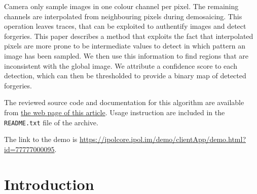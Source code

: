 \documentclass{ipol}
\begin{document}
\begin{ipolAbstract}
        Camera only sample images in one colour channel per pixel. The remaining channels are interpolated from neighbouring pixels during demosaicing. This operation leaves traces, that can be exploited to authentify images and detect forgeries. This paper describes a method that exploits the fact that interpolated pixels are more prone to be intermediate values to detect in which pattern an image has been sampled. We then use this information to find regions that are inconsistent with the global image. We attribute a confidence score to each detection, which can then be thresholded to provide a binary map of detected forgeries.
\end{ipolAbstract}

\begin{ipolCode}
The reviewed source code and documentation for this algorithm are
available from \href{\ipolLink}{the web page of this
article}. Usage instruction are included in the
\verb|README.txt| file of the archive.
\end{ipolCode}

\begin{ipolSupp}
The link to the demo is \href{https://ipolcore.ipol.im/demo/clientApp/demo.html?id=77777000095}{https://ipolcore.ipol.im/demo/clientApp/demo.html?id=77777000095}.
\end{ipolSupp}

\newpage

\section{Introduction}
\end{document}
